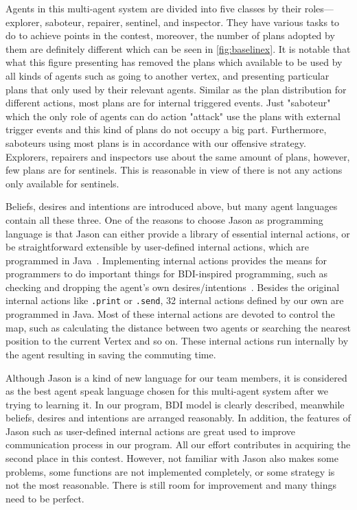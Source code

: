 Agents in this multi-agent system are divided into five classes by their roles---explorer, saboteur, repairer, sentinel, and inspector.
They have various tasks to do to achieve points in the contest, moreover, the number of plans adopted by them are definitely different which can be seen in \autoref{fig:baselinex}.
It is notable that what this figure presenting has removed the plans which available to be used by all kinds of agents such as going to another vertex, and presenting particular plans that only used by their relevant agents.
Similar as the plan distribution for different actions, most plans are for internal triggered events.
Just "saboteur" which the only role of agents can do action "attack" use the plans with external trigger events and this kind of plans do not occupy a big part.
Furthermore, saboteurs using most plans is in accordance with our offensive strategy.
Explorers, repairers and inspectors use about the same amount of plans, however, few plans are for sentinels.
This is reasonable in view of there is not any actions only available for sentinels.

Beliefs, desires and intentions are introduced above, but many agent languages contain all these three.
One of the reasons to choose Jason as programming language is that Jason can either provide a library of essential internal actions, or be straightforward extensible by user-defined internal actions, which are programmed in Java~\cite{rafael_Javabased_2007}.
Implementing internal actions provides the means for programmers to do important things for BDI-inspired programming, such as checking and dropping the agent's own
desires/intentions~\cite{rafael_overviewjason_2006}.
Besides the original internal actions like \texttt{.print} or \texttt{.send}, 32 internal actions defined by our own are programmed in Java.
Most of these internal actions are devoted to control the map, such as calculating the distance between two agents or searching the nearest position to the current Vertex and so on.
These internal actions run internally by the agent resulting in saving the commuting time.

Although Jason is a kind of new language for our team members, it is considered as the best agent speak language chosen for this multi-agent system after we trying to learning it.
In our program, BDI model is clearly described, meanwhile beliefs, desires and intentions are arranged reasonably.
In addition, the features of Jason such as user-defined internal actions are great used to improve communication process in our program.
All our effort contributes in acquiring the second place in this contest.
However, not familiar with Jason also makes some problems, some functions are not implemented completely, or some strategy is not the most reasonable.
There is still room for improvement and many things need to be perfect.
